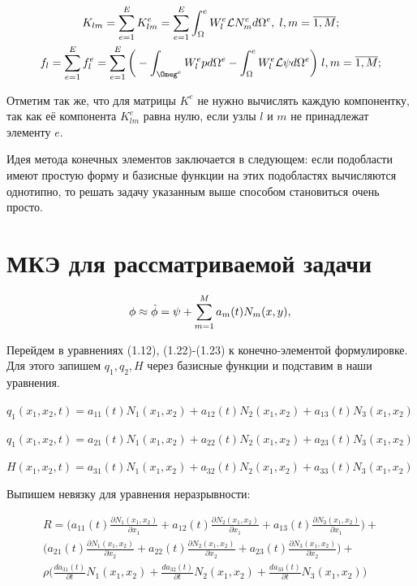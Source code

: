 \documentclass[14pt]{extreport}
\begin{document}
\begin{gather}
	K_{lm}=\sum\limits_{e=1}^{E} K_{lm}^{e}=\sum\limits_{e=1}^{E}\int_\Omega^{e} W_l^{e} \mathcal L N_{m}^{e}  d\Omega^{e}, \; l,m=\overline{1,M}; \\
f_l=\sum\limits_{e=1}^{E} f_{l}^{e}=\sum\limits_{e=1}^{E} \bigg(-\int_{\Omeg^{e}} W_{l}^{e} p d \Omega^{e} -\int_\Omega^{e} W_{l}^{e} \mathcal L \psi d \Omega^{e}\bigg) \; l,m=\overline{1,M};
\end{gather}



Отметим так же, что для матрицы $K^{e}$ не нужно вычислять каждую компонентку, так как её компонента $K_{lm}^{e}$ равна нулю, если узлы $l$ и $m$ не принадлежат элементу $e$. 

Идея метода конечных элементов заключается в следующем: если подобласти имеют простую форму и базисные функции на этих подобластях вычисляются однотипно, то решать задачу указанным выше способом становиться очень просто. 




\section{МКЭ для рассматриваемой задачи}

$$
\phi \approx \hat\phi = \psi + \sum\limits_{m=1}^{M} a_m(t)N_m(x,y),\nonumber\\
$$

Перейдем в уравнениях (1.12), (1.22)-(1.23) к конечно-элементой формулировке. Для этого запишем $q_1, q_2, H$ через базисные функции и подставим в наши уравнения.

$q_1(x_1, x_2, t)=a_{11}(t)N_1(x_1, x_2) + a_{12}(t)N_2(x_1, x_2) + a_{13}(t)N_3(x_1, x_2)$

$q_1(x_1, x_2, t)=a_{21}(t)N_1(x_1, x_2) + a_{22}(t)N_2(x_1, x_2) + a_{23}(t)N_3(x_1, x_2)$

$H(x_1, x_2, t)=a_{31}(t)N_1(x_1, x_2) + a_{32}(t)N_2(x_1, x_2) + a_{33}(t)N_3(x_1, x_2)$


Выпишем невязку для уравнения неразрывности:

\begin{eqnarray}
R=\bigg(a_{11}(t)\frac{\partial N_1(x_1, x_2)}{\partial x_1} + a_{12}(t)\frac{\partial N_2(x_1, x_2)}{\partial x_1} + a_{13}(t)\frac{\partial N_3(x_1, x_2)}{\partial x_1} \bigg) + \\
	\bigg(a_{21}(t)\frac{\partial N_1(x_1, x_2)}{\partial x_2} + a_{22}(t)\frac{\partial N_2(x_1, x_2)}{\partial x_2} + a_{23}(t)\frac{\partial N_3(x_1, x_2)}{\partial x_2} \bigg) + \\
	\rho\bigg(\frac{d a_{31}(t)}{\partial t}N_1(x_1, x_2) + \frac{d a_{32}(t)}{\partial t}N_2(x_1, x_2) + \frac{d a_{33}(t)}{\partial t}N_3(x_1, x_2) \bigg)
\end{eqnarray}
\end{document}
